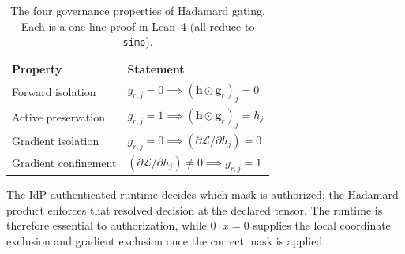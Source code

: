 \documentclass[11pt,a4paper]{article}
\newcommand{\bh}{\mathbf{h}}
\newcommand{\bg}{\mathbf{g}}
\newcommand{\cL}{\mathcal{L}}
\begin{document}
\begin{table}[ht]
\centering
\caption{The four governance properties of Hadamard gating.
Each is a one-line proof in Lean~4 (all reduce to \texttt{simp}).}
\label{tab:governance}
\begin{tabular}{@{}p{3.5cm}p{9cm}@{}}
\toprule
\textbf{Property} & \textbf{Statement} \\
\midrule
Forward isolation &
$g_{r,j} = 0 \implies (\bh \odot \bg_r)_j = 0$ \\
Active preservation &
$g_{r,j} = 1 \implies (\bh \odot \bg_r)_j = h_j$ \\
Gradient isolation &
$g_{r,j} = 0 \implies
(\partial \cL / \partial h_j) = 0$ \\
Gradient confinement &
$(\partial \cL / \partial h_j) \neq 0 \implies
g_{r,j} = 1$ \\
\bottomrule
\end{tabular}
\end{table}

The IdP-authenticated runtime decides which mask is authorized; the
Hadamard product enforces that resolved decision at the declared
tensor.  The runtime is therefore essential to authorization, while
$0\cdot x=0$ supplies the local coordinate exclusion and gradient
exclusion once the correct mask is applied.
\end{document}
